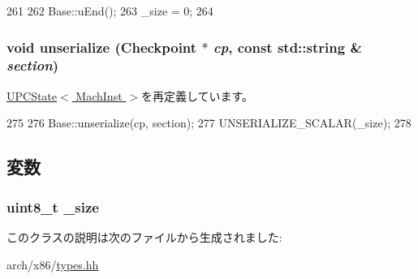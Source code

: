 \begin{DoxyCode}
261         {
262             Base::uEnd();
263             _size = 0;
264         }
\end{DoxyCode}
\hypertarget{classX86ISA_1_1PCState_af22e5d6d660b97db37003ac61ac4ee49}{
\subsubsection[{unserialize}]{\setlength{\rightskip}{0pt plus 5cm}void unserialize ({\bf Checkpoint} $\ast$ {\em cp}, \/  const std::string \& {\em section})}}
\label{classX86ISA_1_1PCState_af22e5d6d660b97db37003ac61ac4ee49}


\hyperlink{classGenericISA_1_1UPCState_af22e5d6d660b97db37003ac61ac4ee49}{UPCState$<$ MachInst $>$}を再定義しています。


\begin{DoxyCode}
275         {
276             Base::unserialize(cp, section);
277             UNSERIALIZE_SCALAR(_size);
278         }
\end{DoxyCode}


\subsection{変数}
\hypertarget{classX86ISA_1_1PCState_aaa049a794bf092e892763bad507598b5}{
\subsubsection[{\_\-size}]{\setlength{\rightskip}{0pt plus 5cm}uint8\_\-t {\bf \_\-size}}}
\label{classX86ISA_1_1PCState_aaa049a794bf092e892763bad507598b5}


このクラスの説明は次のファイルから生成されました:\begin{DoxyCompactItemize}
\item 
arch/x86/\hyperlink{arch_2x86_2types_8hh}{types.hh}\end{DoxyCompactItemize}
